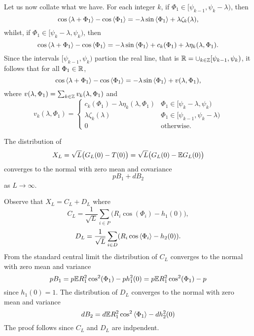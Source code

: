 \documentclass[journal]{IEEEtran}
\begin{document}
\begin{IEEEproof}
Let us now collate what we have.  For each integer $k$, if $\Phi_1 \in [\psi_{k-1}, \psi_{k} - \lambda )$, then
\[
\cos\left\langle \lambda + \Phi_1 \right\rangle - \cos\left\langle \Phi_1 \right\rangle = -\lambda\sin\left\langle \Phi_1 \right\rangle + \lambda\zeta_k(\lambda),
\]
whilst, if $\Phi_1 \in [ \psi_{k} - \lambda,\psi_{k})$, then
\[
\cos\left\langle \lambda + \Phi_1 \right\rangle - \cos\left\langle \Phi_1 \right\rangle = -\lambda \sin\left\langle \Phi_1 \right\rangle + c_k(\Phi_1) + \lambda\eta_k(\lambda, \Phi_1).
\]
Since the intervals $[\psi_{k-1}, \psi_{k})$ partion the real line, that is ${\mathbb R} = \cup_{k\in{\mathbb Z}}[\psi_{k-1}, \psi_{k})$, it follows that for all $\Phi_1 \in {\mathbb R}$,
\[
\cos\left\langle \lambda + \Phi_1 \right\rangle - \cos\left\langle \Phi_1 \right\rangle = -\lambda\sin\left\langle \Phi_1 \right\rangle +  v(\lambda, \Phi_1),
\]
where $v(\lambda, \Phi_1) = \sum_{k\in{\mathbb Z}} v_k(\lambda, \Phi_1)$ and
\begin{equation}\label{eq:vk}
v_k(\lambda,\Phi_1) = \begin{cases}
c_k(\Phi_1) - \lambda\eta_k(\lambda, \Phi_1) &  \Phi_1 \in [ \psi_{k} - \lambda,\psi_{k} ) \\
\lambda\zeta_k(\lambda) & \Phi_1 \in [\psi_{k-1}, \psi_{k} - \lambda ) \\
0 & \text{otherwise}.
\end{cases}
\end{equation}
\end{IEEEproof}



\begin{lemma}\label{lem:XL} 
The distribution of 
\[
X_L = \sqrt{L} \big( G_L(0) - T(0) \big) = \sqrt{L} \big( G_L(0) - {\mathbb E} G_L(0) \big)
\] 
converges to the normal with zero mean and covariance 
\[
pB_1 + d B_2
\] 
as $L \rightarrow\infty$.
\end{lemma}
\begin{IEEEproof}
Observe that $X_L = C_L + D_L$ where
\[
C_L = \frac{1}{\sqrt{L}} \sum_{i \in P} \big( R_i \cos(\Phi_i) - h_1(0) \big),
\]
\[
D_L = \frac{1}{\sqrt{L}} \sum_{i \in D} (R_i \cos\left\langle \Phi_i \right\rangle - h_2(0) ).
\]
From the standard central limit the distribution of $C_L$ converges to the normal with zero mean and variance
\[
p B_1 = p {\mathbb E} R_1^2 \cos^2(\Phi_1) - p h_1^2(0) =  p {\mathbb E} R_1^2 \cos^2(\Phi_1) - p 
\]
since $h_1(0) = 1$.  The distribution of $D_L$ converges to the normal with zero mean and variance
\[
d B_2 = d {\mathbb E} R_1^2 \cos^2\left\langle \Phi_1 \right\rangle - d h_2^2(0)
\]
The proof follows since $C_L$ and $D_L$ are indpendent.
\end{IEEEproof}
\end{document}
